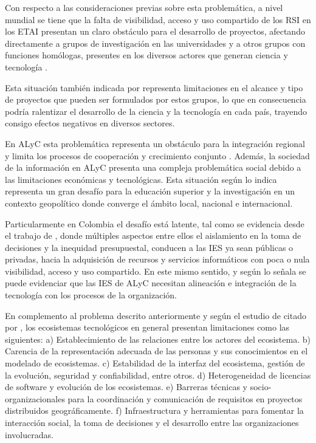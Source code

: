 Con respecto a las consideraciones previas sobre esta problemática, a nivel mundial se tiene que la falta de visibilidad, acceso y uso compartido de los \acrshort{RSI} en los \acrshort{ETAI} presentan un claro obstáculo para el desarrollo de proyectos, afectando directamente a grupos de investigación en las universidades y a otros grupos con funciones homólogas, presentes en los diversos actores que generan ciencia y tecnología \parencite{Weigel2020}.

Esta situación también indicada por \parencite{Herrera2009} representa limitaciones en el alcance y tipo de proyectos que pueden ser formulados por estos grupos, lo que en consecuencia podría ralentizar el desarrollo de la ciencia y la tecnología en cada país, trayendo consigo efectos negativos en diversos sectores.

En \acrfull{ALyC} esta problemática representa un obstáculo para la integración regional y limita los procesos de cooperación y crecimiento conjunto \parencite{CINTEL2010, Diaz2016,Moreno-Escobar2007}. Además, la sociedad de la información en \acrshort{ALyC} presenta una compleja problemática social debido a las limitaciones económicas y tecnológicas. Esta situación según lo indica \textcite{Bautista2019} representa un gran desafío para la educación superior y la investigación en un contexto geopolítico donde converge el ámbito local, nacional e internacional.

Particularmente en Colombia el desafío está latente, tal como se evidencia desde el trabajo de \textcite{Castro2009}, donde múltiples aspectos entre ellos el aislamiento en la toma de decisiones y la inequidad presupuestal, conducen a las \acrfull{IES} ya sean públicas o privadas, hacia la adquisición de recursos y servicios informáticos con poca o nula visibilidad, acceso y uso compartido. En este mismo sentido, y según lo señala \textcite{Rico-Bautista2020} se puede evidenciar que las \acrshort{IES} de \acrshort{ALyC} necesitan alineación e integración de la tecnología con los procesos de la organización.

En complemento al problema descrito anteriormente y según el estudio de \textcite{Barbosa2011} citado por \textcite{Garcia-Holgado2018}, los ecosistemas tecnológicos en general presentan limitaciones como las siguientes: a) Establecimiento de las relaciones entre los actores del ecosistema. b) Carencia de la representación adecuada de las personas y sus conocimientos en el modelado de ecosistemas. c) Estabilidad de la interfaz del ecosistema, gestión de la evolución, seguridad y confiabilidad, entre otros. d) Heterogeneidad de licencias de software y evolución de los ecosistemas. e) Barreras técnicas y socio-organizacionales para la coordinación y comunicación de requisitos en proyectos distribuidos geográficamente. f) Infraestructura y herramientas para fomentar la interacción social, la toma de decisiones y el desarrollo entre las organizaciones involucradas.

